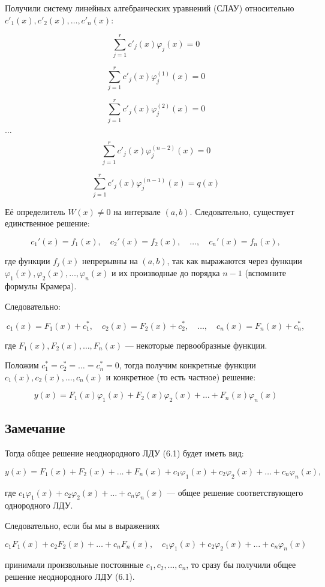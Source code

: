 {	Получили систему линейных алгебраических уравнений (СЛАУ) относительно \( c'_1(x), c'_2(x), \ldots, c'_n(x) \):


	\[
	\sum_{j=1}^{r} c'_j(x) \varphi_j(x) = 0
	\]




	\[
	\sum_{j=1}^{r} c'_j(x) \varphi_j^{(1)}(x) = 0
	\]




	\[
	\sum_{j=1}^{r} c'_j(x) \varphi_j^{(2)}(x) = 0
	\]

	\(
		\ldots	
	\)

	\[
	\sum_{j=1}^{r} c'_j(x) \varphi_j^{(n-2)}(x) = 0
	\]


	\[
	\sum_{j=1}^{r} c'_j(x) \varphi_j^{(n-1)}(x) = q(x)
	\]

	Её определитель \( W(x) \neq 0 \) на интервале \( (a, b) \). Следовательно, существует единственное решение:


	\[
	c_1'(x) = f_1(x), \quad c_2'(x) = f_2(x), \quad \ldots, \quad c_n'(x) = f_n(x),
	\]


	где функции \( f_j(x) \) непрерывны на \( (a, b) \), так как выражаются через функции \( \varphi_1(x), \varphi_2(x), \ldots, \varphi_n(x) \) и их производные до порядка \( n-1 \) (вспомните формулы Крамера).

	Следовательно:


	\[
	c_1(x) = F_1(x) + c^*_1, \quad c_2(x) = F_2(x) + c^*_2, \quad \ldots, \quad c_n(x) = F_n(x) + c^*_n,
	\]


	где \( F_1(x), F_2(x), \ldots, F_n(x) \) — некоторые первообразные функции.

	Положим \( c^*_1 = c^*_2 = \ldots = c^*_n = 0 \), тогда получим конкретные функции \( c_1(x), c_2(x), \ldots, c_n(x) \) и конкретное (то есть частное) решение:


	\[
	y(x) = F_1(x)\varphi_1(x) + F_2(x)\varphi_2(x) + \ldots + F_n(x)\varphi_n(x)
	\]

	\subsection*{Замечание}

Тогда общее решение неоднородного ЛДУ (6.1) будет иметь вид:


\[
y(x) = F_1(x) + F_2(x) + \ldots + F_n(x) + c_1 \varphi_1(x) + c_2 \varphi_2(x) + \ldots + c_n \varphi_n(x),
\]


где \( c_1 \varphi_1(x) + c_2 \varphi_2(x) + \ldots + c_n \varphi_n(x) \) — общее решение соответствующего однородного ЛДУ.

Следовательно, если бы мы в выражениях


\[
c_1 F_1(x) + c_2 F_2(x) + \ldots + c_n F_n(x), \quad
c_1 \varphi_1(x) + c_2 \varphi_2(x) + \ldots + c_n \varphi_n(x)
\]


принимали произвольные постоянные \( c_1, c_2, \ldots, c_n \), то сразу бы получили общее решение неоднородного ЛДУ (6.1).


	\newpage
}